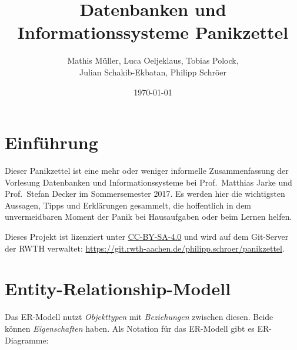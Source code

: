 \documentclass[a4paper,parskip=half*,DIV=15,fontsize=11pt]{scrartcl}
\title{Datenbanken und Informationssysteme Panikzettel}
\author{Mathis Müller, Luca Oeljeklaus, Tobias Polock,\\ Julian Schakib-Ekbatan, Philipp Schröer}
\date{\today}
\begin{document}
\maketitle

\setcounter{tocdepth}{2}
\tableofcontents

\section{Einführung}

Dieser Panikzettel ist eine mehr oder weniger informelle Zusammenfassung der Vorlesung Datenbanken und Informationssysteme bei Prof.\ Matthias Jarke und Prof.\ Stefan Decker im Sommersemester 2017. Es werden hier die wichtigsten Aussagen, Tipps und Erklärungen gesammelt, die hoffentlich in dem unvermeidbaren Moment der Panik bei Hausaufgaben oder beim Lernen helfen.

Dieses Projekt ist lizenziert unter \href{https://creativecommons.org/licenses/by-sa/4.0/}{CC-BY-SA-4.0} und wird auf dem Git-Server der RWTH verwaltet: \url{https://git.rwth-aachen.de/philipp.schroer/panikzettel}.

\section{Entity-Relationship-Modell}

Das ER-Modell nutzt \emph{Objekttypen} mit \emph{Beziehungen} zwischen diesen. Beide können \emph{Eigenschaften} haben. Als Notation für das ER-Modell gibt es ER-Diagramme:

\begin{center}
\end{center}
\end{document}
